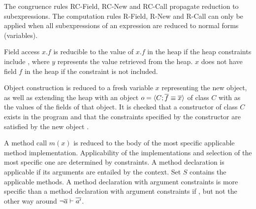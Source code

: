 The congruence rules RC-Field, RC-New and RC-Call propagate reduction to subexpressions.
The computation rules R-Field, R-New and R-Call can only be applied
when all subexpressions of an expression are reduced to normal forms (variables).

Field access $x.f$ is reducible to the value of $x.f$ in the heap
if the heap constraints include ,
where $y$ represents the value retrieved from the heap.
$x$ does not have field $f$ in the heap if the constraint is not included.

Object construction  is reduced
to a fresh variable $x$ representing the new object,
as well as extending the heap with an object $o = \langle C; \overline{f} \equiv \overline{x} \rangle$ of class $C$ with
 as the values of the fields of that object.
It is checked that a constructor of class $C$ exists in the program
and that the constraints  specified by the constructor
are satisfied by the new object .

A method call $m(x)$ is reduced to the body of the most specific applicable method implementation.
Applicability of the implementations and selection of the most specific one
are determined by constraints.
A method declaration is applicable if its arguments are entailed by the context.
Set $S$ contains the applicable methods.
A method declaration with argument constraints 
is more specific than a method declaration with argument constraints 
if ,
but not the other way around $\neg\overline{a} \vdash \overline{a'}$.

